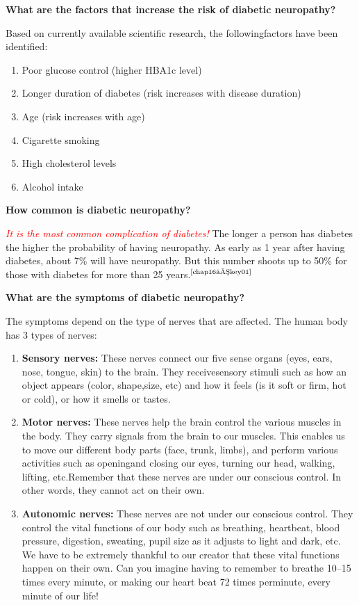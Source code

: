 \vskip 4pt
\noindent\textbf{What are the factors that increase the risk of diabetic neuropathy?}
\vskip 4pt

Based on currently available scientific research, the following\break factors have been identified:

\vspace{-\topsep}
\begin{enumerate}[•]
\itemsep=0pt
\item Poor glucose control (higher HBA1c level)
\item Longer duration of diabetes (risk increases with disease duration)
\item Age (risk increases with age)
\item Cigarette smoking
\item High cholesterol levels
\item Alcohol intake
\end{enumerate}
\vspace{-\topsep}

\noindent\textbf{How common is diabetic neuropathy?}

\textcolor{red}{\textit{It is the most common complication of diabetes!}} The longer a person has diabetes the higher the probability of having neuropathy. As early as 1 year after having diabetes, about 7\% will have neuropathy. But this number shoots up to 50\% for those with diabetes for more than 25 years.$^{\text{\cite{chap16–key01}}}$

\noindent\textbf{What are the symptoms of diabetic neuropathy?}

The symptoms depend on the type of nerves that are affected. The human body has 3 types of nerves:

\vspace{-\topsep}
\begin{enumerate}
\itemsep=0pt
\item \textbf{Sensory nerves:} These nerves connect our five sense organs (eyes, ears, nose, tongue, skin) to the brain. They receive\break sensory stimuli such as how an object appears (color, shape,\break size, etc) and how it feels (is it soft or firm, hot or cold), or how it smells or tastes.
\item \textbf{Motor nerves:} These nerves help the brain control the various muscles in the body. They carry signals from the brain to our muscles. This enables us to move our different body parts (face, trunk, limbs), and perform various activities such as opening\break and closing our eyes, turning our head, walking, lifting, etc.\break Remember that these nerves are under our conscious control. In other words, they cannot act on their own.
\item \textbf{Autonomic nerves:} These nerves are not under our conscious control. They control the vital functions of our body such as breathing, heartbeat, blood pressure, digestion, sweating, pupil size as it adjusts to light and dark, etc. We have to be extremely thankful to our creator that these vital functions happen on their own. Can you imagine having to remember to breathe 10–15 times every minute, or making our heart beat 72 times per\break minute, every minute of our life!
\end{enumerate}

